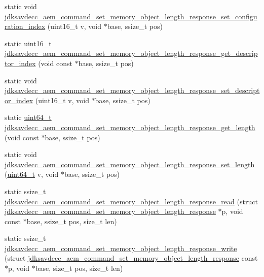 \begin{DoxyCompactItemize}
\item 
static void \hyperlink{group__command__set__memory__object__length__response_gad3c155742294bbb29f3a151b96e9c504}{jdksavdecc\+\_\+aem\+\_\+command\+\_\+set\+\_\+memory\+\_\+object\+\_\+length\+\_\+response\+\_\+set\+\_\+configuration\+\_\+index} (uint16\+\_\+t v, void $\ast$base, ssize\+\_\+t pos)
\item 
static uint16\+\_\+t \hyperlink{group__command__set__memory__object__length__response_gae2647ba54d0e05d4c4194a436606b035}{jdksavdecc\+\_\+aem\+\_\+command\+\_\+set\+\_\+memory\+\_\+object\+\_\+length\+\_\+response\+\_\+get\+\_\+descriptor\+\_\+index} (void const $\ast$base, ssize\+\_\+t pos)
\item 
static void \hyperlink{group__command__set__memory__object__length__response_ga21593647fa64baa347b2739f1383adf9}{jdksavdecc\+\_\+aem\+\_\+command\+\_\+set\+\_\+memory\+\_\+object\+\_\+length\+\_\+response\+\_\+set\+\_\+descriptor\+\_\+index} (uint16\+\_\+t v, void $\ast$base, ssize\+\_\+t pos)
\item 
static \hyperlink{parse_8c_aec6fcb673ff035718c238c8c9d544c47}{uint64\+\_\+t} \hyperlink{group__command__set__memory__object__length__response_ga5cd962cb047db9a38b577037eb5a5f9a}{jdksavdecc\+\_\+aem\+\_\+command\+\_\+set\+\_\+memory\+\_\+object\+\_\+length\+\_\+response\+\_\+get\+\_\+length} (void const $\ast$base, ssize\+\_\+t pos)
\item 
static void \hyperlink{group__command__set__memory__object__length__response_ga334e67c0c07f77b30388542f92d1b186}{jdksavdecc\+\_\+aem\+\_\+command\+\_\+set\+\_\+memory\+\_\+object\+\_\+length\+\_\+response\+\_\+set\+\_\+length} (\hyperlink{parse_8c_aec6fcb673ff035718c238c8c9d544c47}{uint64\+\_\+t} v, void $\ast$base, ssize\+\_\+t pos)
\item 
static ssize\+\_\+t \hyperlink{group__command__set__memory__object__length__response_ga5b5c969f887f41bb95739ea32d528fa2}{jdksavdecc\+\_\+aem\+\_\+command\+\_\+set\+\_\+memory\+\_\+object\+\_\+length\+\_\+response\+\_\+read} (struct \hyperlink{structjdksavdecc__aem__command__set__memory__object__length__response}{jdksavdecc\+\_\+aem\+\_\+command\+\_\+set\+\_\+memory\+\_\+object\+\_\+length\+\_\+response} $\ast$p, void const $\ast$base, ssize\+\_\+t pos, size\+\_\+t len)
\item 
static ssize\+\_\+t \hyperlink{group__command__set__memory__object__length__response_gaf7840c5f1306b45636500e83e65eff20}{jdksavdecc\+\_\+aem\+\_\+command\+\_\+set\+\_\+memory\+\_\+object\+\_\+length\+\_\+response\+\_\+write} (struct \hyperlink{structjdksavdecc__aem__command__set__memory__object__length__response}{jdksavdecc\+\_\+aem\+\_\+command\+\_\+set\+\_\+memory\+\_\+object\+\_\+length\+\_\+response} const $\ast$p, void $\ast$base, size\+\_\+t pos, size\+\_\+t len)
\end{DoxyCompactItemize}


